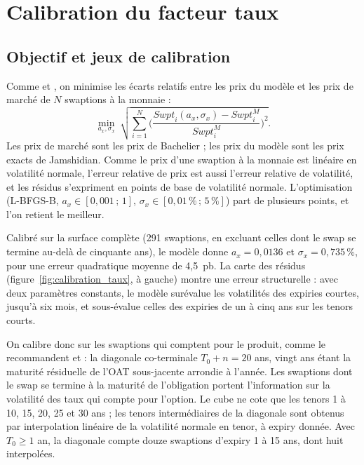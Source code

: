 \section{Calibration du facteur taux}
\label{sec:taux}

\subsection{Objectif et jeux de calibration}

Comme \citet[section~4.2.7]{BrigoMercurio2006} et \citet[éq.~55]{Russo}, on minimise les écarts relatifs entre
les prix du modèle et les prix de marché de $N$ swaptions à la monnaie :
\begin{equation}
\min_{a_x,\sigma_x}\ \sqrt{\sum_{i=1}^{N}\Big(\frac{\mathit{Swpt}_i(a_x,\sigma_x) - \mathit{Swpt}_i^M}{\mathit{Swpt}_i^M}\Big)^2}.
\end{equation}
Les prix de marché sont les prix de Bachelier ; les prix du modèle sont les prix exacts de Jamshidian. Comme le
prix d'une swaption à la monnaie est linéaire en volatilité normale, l'erreur relative de prix est aussi l'erreur
relative de volatilité, et les résidus s'expriment en points de base de volatilité normale. L'optimisation
(L-BFGS-B, $a_x \in [0{,}001\,;\,1]$, $\sigma_x \in [0{,}01\,\%\,;\,5\,\%]$) part de plusieurs points, et l'on
retient le meilleur.

Calibré sur la surface complète (291 swaptions, en excluant celles dont le swap se termine au-delà de cinquante
ans), le modèle donne $a_x = 0{,}0136$ et $\sigma_x = 0{,}735\,\%$, pour une erreur quadratique moyenne de 4,5~pb.
La carte des résidus (figure~\ref{fig:calibration_taux}, à gauche) montre une erreur structurelle : avec deux
paramètres constants, le modèle surévalue les volatilités des expiries courtes, jusqu'à six mois, et sous-évalue
celles des expiries de un à cinq ans sur les tenors courts.

On calibre donc sur les swaptions qui comptent pour le produit, comme le recommandent
\citet[section~4.2.7]{BrigoMercurio2006} et \citet[section~6.3.7]{Chaix2021} : la diagonale co-terminale
$T_0 + n = 20$ ans, vingt ans étant la maturité résiduelle de l'OAT sous-jacente arrondie à l'année. Les swaptions
dont le swap se termine à la maturité de l'obligation portent l'information sur la volatilité des taux qui
compte pour l'option. Le cube ne cote que les tenors 1 à 10, 15, 20, 25 et 30 ans ; les tenors intermédiaires de
la diagonale sont obtenus par interpolation linéaire de la volatilité normale en tenor, à expiry donnée. Avec
$T_0 \ge 1$ an, la diagonale compte douze swaptions d'expiry 1 à 15 ans, dont huit interpolées.

